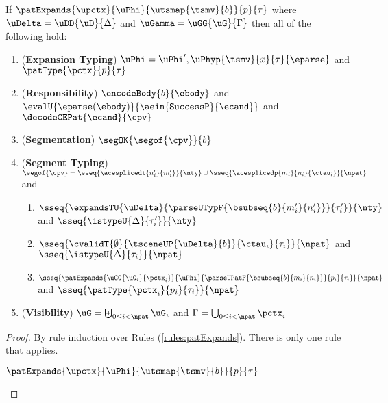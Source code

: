 \begin{grayparbox}
\begin{theorem}
\label{thm:spTLM-Typing-Segmentation}
If $\patExpands{\upctx}{\uPhi}{\utsmap{\tsmv}{b}}{p}{\tau}$ where $\uDelta=\uDD{\uD}{\Delta}$ and $\uGamma=\uGG{\uG}{\Gamma}$ then all of the following hold:
\begin{enumerate}
        \item (\textbf{Expansion Typing}) $\uPhi=\uPhi', \uPhyp{\tsmv}{x}{\tau}{\eparse}$ and $\patType{\pctx}{p}{\tau}$
        \item (\textbf{Responsibility}) $\encodeBody{b}{\ebody}$ and $\evalU{\eparse(\ebody)}{\aein{\mathtt{SuccessP}}{\ecand}}$ and $\decodeCEPat{\ecand}{\cpv}$
        \item (\textbf{Segmentation}) $\segOK{\segof{\cpv}}{b}$
        \item (\textbf{Segment Typing}) $\segof{\cpv} = \sseq{\acesplicedt{n'_i}{m'_i}}{\nty} \cup \sseq{\acesplicedp{m_i}{n_i}{\ctau_i}}{\npat}$ and 
        \begin{enumerate}
        \item  $\sseq{
              \expandsTU{\uDelta}
              {
                \parseUTypF{\bsubseq{b}{m'_i}{n'_i}}
              }{\tau'_i}
            }{\nty}$ and $\sseq{\istypeU{\Delta}{\tau'_i}}{\nty}$
        \item $\sseq{
          \cvalidT{\emptyset}{
            \tsceneUP
              {\uDelta}{b}
          }{
            \ctau_i
          }{\tau_i}
        }{\npat}$ and $\sseq{\istypeU{\Delta}{\tau_i}}{\npat}$
        \item $\sseq{
          \patExpands
            {\uGG{\uG_i}{\pctx_i}}
            {\uPhi}
            {\parseUPatF{\bsubseq{b}{m_i}{n_i}}}
            {p_i}
            {\tau_i}
        }{\npat}$  and $\sseq{\patType{\pctx_i}{p_i}{\tau_i}}{\npat}$
      \end{enumerate}
      \item (\textbf{Visibility}) $\uG = \biguplus_{0 \leq i < \npat} \uG_i$ and $\Gamma = \bigcup_{0 \leq i < \npat} \pctx_i$
\end{enumerate}
\end{theorem}
\begin{proof} By rule induction over Rules (\ref{rules:patExpands}). There is only one rule that applies.
\begin{byCases}
  \item[\text{(\ref{rule:patExpands-apuptsm})}] 
    \begin{pfsteps*}
      \item $\patExpands{\upctx}{\uPhi}{\utsmap{\tsmv}{b}}{p}{\tau}$  

\end{pfsteps*}
\end{byCases}
\end{proof}
\end{grayparbox}
